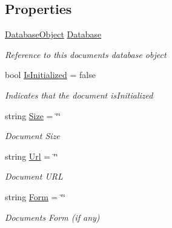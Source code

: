 \subsection*{Properties}
\begin{DoxyCompactItemize}
\item 
\mbox{\hyperlink{class_database_object}{Database\+Object}} \mbox{\hyperlink{class_document_object_a69d5338c9835f748490323d2950eed09}{Database}}
\begin{DoxyCompactList}\small\item\em Reference to this documents database object \end{DoxyCompactList}\item 
bool \mbox{\hyperlink{class_document_object_a3b2075b73f38d05091b69decc6ce7992}{Is\+Initialized}} = false
\begin{DoxyCompactList}\small\item\em Indicates that the document is\+Initialized \end{DoxyCompactList}\item 
string \mbox{\hyperlink{class_document_object_abdc1a6dfc1bb2261b523cf94468448b9}{Size}} = \char`\"{}\char`\"{}
\begin{DoxyCompactList}\small\item\em Document Size \end{DoxyCompactList}\item 
string \mbox{\hyperlink{class_document_object_ac86b730cf8931b2221af577d32ca2f31}{Url}} = \char`\"{}\char`\"{}
\begin{DoxyCompactList}\small\item\em Document U\+RL \end{DoxyCompactList}\item 
string \mbox{\hyperlink{class_document_object_ad3444a6c018474405064070fa9a94afe}{Form}} = \char`\"{}\char`\"{}
\begin{DoxyCompactList}\small\item\em Documents Form (if any) \end{DoxyCompactList}\item 

\end{DoxyCompactItemize}
